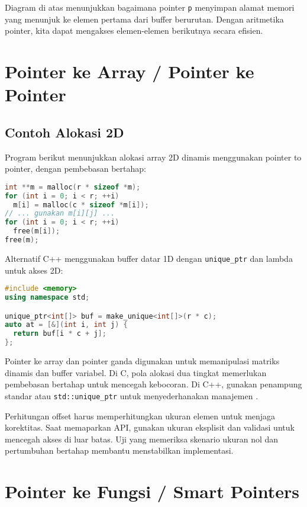\documentclass[../main.tex]{subfiles}
\begin{document}
Diagram di atas menunjukkan bagaimana pointer \texttt{p} menyimpan alamat memori yang menunjuk ke elemen pertama dari buffer berurutan. Dengan aritmetika pointer, kita dapat mengakses elemen-elemen berikutnya secara efisien.

\section{Pointer ke Array / Pointer ke Pointer}
\subsection{Contoh Alokasi 2D}

Program berikut menunjukkan alokasi array 2D dinamis menggunakan pointer to pointer, dengan pembebasan bertahap:

\begin{lstlisting}[language=C, caption={Matriks dinamis 2D di C (pointer ganda)}]
int **m = malloc(r * sizeof *m);
for (int i = 0; i < r; ++i)
  m[i] = malloc(c * sizeof *m[i]);
// ... gunakan m[i][j] ...
for (int i = 0; i < r; ++i)
  free(m[i]);
free(m);
\end{lstlisting}

Alternatif C++ menggunakan buffer datar 1D dengan \texttt{unique\_ptr} dan lambda untuk akses 2D:

\begin{lstlisting}[language=C++, caption={std::unique\_ptr\textless T[]\textgreater{} untuk buffer 2D datar}]
#include <memory>
using namespace std;

unique_ptr<int[]> buf = make_unique<int[]>(r * c);
auto at = [&](int i, int j) {
  return buf[i * c + j];
};
\end{lstlisting}
Pointer ke array dan pointer ganda digunakan untuk memanipulasi matriks dinamis dan buffer variabel. Di C, pola alokasi dua tingkat memerlukan pembebasan bertahap untuk mencegah kebocoran. Di C++, gunakan penampung standar atau \texttt{std::unique\_ptr} untuk menyederhanakan manajemen \parencite{iso-c-draft-n1570,cpp-reference}.

Perhitungan offset harus memperhitungkan ukuran elemen untuk menjaga korektitas. Saat memaparkan API, gunakan ukuran eksplisit dan validasi untuk mencegah akses di luar batas. Uji yang memeriksa skenario ukuran nol dan pertumbuhan bertahap membantu menstabilkan implementasi.

\section{Pointer ke Fungsi / Smart Pointers}
\end{document}
